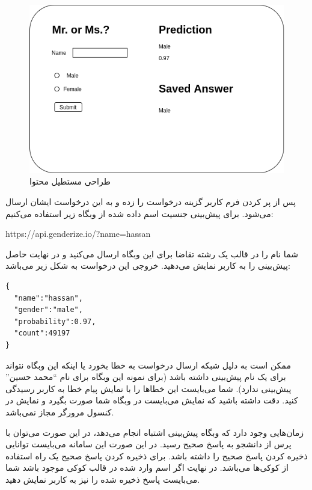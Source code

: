 \documentclass[../main.tex]{subfiles}
\begin{document}
\begin{figure}[h]
  \centering
  \includegraphics[scale=0.25]{./genderize-content}
  \caption{طراحی مستطیل محتوا}
\end{figure}

پس از پر کردن فرم کاربر گزینه درخواست را زده و به این درخواست ایشان ارسال می‌شود. برای پیش‌بینی جنسیت اسم داده شده از وبگاه زیر استفاده می‌کنیم:

\begin{latin}\begin{center}
https://api.genderize.io/?name=hassan
\end{center}\end{latin}

شما نام را در قالب یک رشته تقاضا برای این وبگاه ارسال می‌کنید و در نهایت حاصل پیش‌بینی را به کاربر نمایش می‌دهید. خروجی این درخواست به شکل زیر می‌باشد:

\begin{latin}
\begin{verbatim}
{
  "name":"hassan",
  "gender":"male",
  "probability":0.97,
  "count":49197
}
\end{verbatim}
\end{latin}

ممکن است به دلیل شبکه ارسال درخواست به خطا بخورد یا اینکه این وبگاه نتواند برای یک نام پیش‌بینی داشته باشد (برای نمونه این وبگاه برای نام ``محمد حسین'' پیش‌بینی ندارد). شما می‌بایست این خطاها را با نمایش پیام خطا به کاربر رسیدگی کنید. دقت داشته باشید که نمایش می‌بایست در وبگاه شما صورت بگیرد و نمایش در کنسول مرورگر مجاز نمی‌باشد.

زمان‌هایی وجود دارد که وبگاه پیش‌بینی اشتباه انجام می‌دهد، در این صورت می‌توان با پرس از دانشجو به پاسخ صحیح رسید. در این صورت این سامانه می‌بایست توانایی ذخیره کردن پاسخ صحیح را داشته باشد. برای ذخیره کردن پاسخ صحیح یک راه استفاده از کوکی‌ها می‌باشد. در نهایت اگر اسم وارد شده در قالب کوکی موجود باشد شما می‌بایست پاسخ ذخیره شده را نیز به کاربر نمایش دهید.
\end{document}
